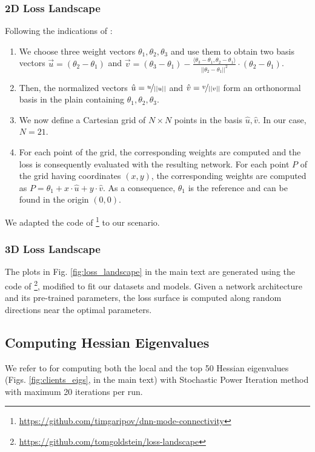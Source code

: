 \subsubsection{2D Loss Landscape} Following the indications of \cite{garipov2018loss,mirzadeh2020linear}:
\begin{enumerate}
    \item We choose three weight vectors $\theta_1, \theta_2, \theta_3$ and use them to obtain two basis vectors $\vec u = (\theta_2-\theta_1)$ and $\vec{v} = (\theta_3-\theta_1) - \frac{\langle\theta_3-\theta_1, \theta_2-\theta_1\rangle}{||\theta_2-\theta_1||^2}\cdot(\theta_2-\theta_1)$.
    \item Then, the normalized vectors $\hat{u}=\nicefrac{u}{||u||}$ and $\hat{v}=\nicefrac{v}{||v||}$ form an orthonormal basis in the plain containing $\theta_1, \theta_2, \theta_3$. 
    \item We now define a Cartesian grid of $N\times N$ points in the basis $\hat{u},\hat{v}$. In our case, $N=21$. 
    \item For each point of the grid, the corresponding weights are computed and the loss is consequently evaluated with the resulting network. For each point $P$ of the grid having coordinates $(x,y)$, the corresponding weights are computed as $P = \theta_1 + x \cdot \hat{u} + y \cdot \hat{v}$. As a consequence, $\theta_1$ is the reference and can be found in the origin $(0,0)$.
\end{enumerate}
We adapted the code of \cite{garipov2018loss}\footnote{\url{https://github.com/timgaripov/dnn-mode-connectivity}} to our scenario.

\subsubsection{3D Loss Landscape} The plots in Fig. \ref{fig:loss_landscape} in the main text are generated using the code of \cite{visualloss}\footnote{\url{https://github.com/tomgoldstein/loss-landscape}}, modified to fit our datasets and models. Given a network architecture and its pre-trained parameters, the loss surface is computed along random directions near the optimal parameters.  

\subsection{Computing Hessian Eigenvalues}
We refer to \cite{hessian-eigenthings} for computing both the local and the top 50 Hessian eigenvalues (Figs. \ref{fig:clients_eigs},{\color{red}{5}}
in the main text) with Stochastic Power Iteration method \cite{xu2018accelerated} with maximum 20 iterations per run.

